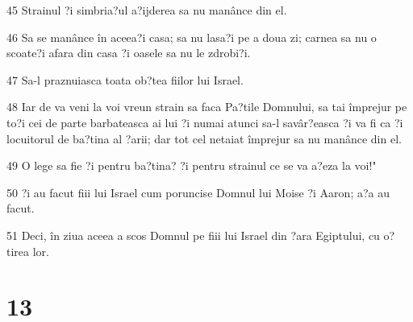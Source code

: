 \par 45 Strainul ?i simbria?ul a?ijderea sa nu manânce din el.
\par 46 Sa se manânce în aceea?i casa; sa nu lasa?i pe a doua zi; carnea sa nu o scoate?i afara din casa ?i oasele sa nu le zdrobi?i.
\par 47 Sa-l praznuiasca toata ob?tea fiilor lui Israel.
\par 48 Iar de va veni la voi vreun strain sa faca Pa?tile Domnului, sa tai împrejur pe to?i cei de parte barbateasca ai lui ?i numai atunci sa-l savâr?easca ?i va fi ca ?i locuitorul de ba?tina al ?arii; dar tot cel netaiat împrejur sa nu manânce din el.
\par 49 O lege sa fie ?i pentru ba?tina? ?i pentru strainul ce se va a?eza la voi!"
\par 50 ?i au facut fiii lui Israel cum poruncise Domnul lui Moise ?i Aaron; a?a au facut.
\par 51 Deci, în ziua aceea a scos Domnul pe fiii lui Israel din ?ara Egiptului, cu o?tirea lor.

\chapter{13}

